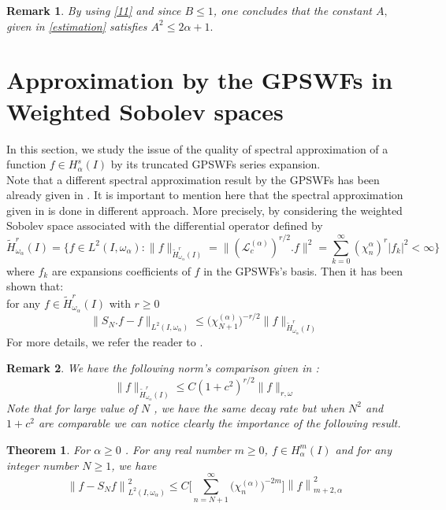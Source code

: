 \documentclass[]{article}
\newtheorem{theorem}{Theorem}
\newtheorem{remark}{Remark}
\newcounter{rea}
\newcommand{\norm}[1]{{\left\|{#1}\right\|}}
\begin{document}
\begin{remark} \label{rq}
By using \eqref{11} and since $B\leq1$, one concludes that the constant $A,$ given in \eqref{estimation} satisfies $A^2\leq 2\alpha+1.$
\end{remark}


\section{Approximation by the GPSWFs in Weighted Sobolev spaces}



In this section, we study the issue of the quality of spectral approximation of a function $f \in H^s_{\alpha}(I)$ by its truncated GPSWFs series expansion. \\
Note that a different spectral approximation result by the GPSWFs has been already given in \cite{Wang2}. It is important to mention here that the spectral approximation given in \cite{Wang2} is done in different approach. More precisely, by considering the weighted Sobolev space associated with the differential operator defined by
$$ \widetilde{H}^{r}_{\omega_{\alpha}}(I) = \{ f\in L^2(I,\omega_{\alpha}): \|f\|_{\widetilde{H}^{r}_{\omega_{\alpha}}(I)} = \|(\mathcal{L}^{(\alpha)}_c)^{r/2}.f\|^2 = \sum_{k=0}^{\infty}(\chi_n^{\alpha})^r |f_k|^2 <\infty \} $$
where $f_k$ are expansions coefficients of $f$ in the GPSWFs's basis. Then it has been shown that: \\
for any $f \in \widetilde{H}^{r}_{\omega_{\alpha}}(I) $ with $ r\geq 0 $
$$ \| S_{N}.f-f \|_{L^2(I,\omega_{\alpha})} \leq \Big( \chi^{(\alpha)}_{N+1} \Big)^{-r/2} \|f\|_{\widetilde{H}^{r}_{\omega_{\alpha}}(I)} $$
For more details, we refer the reader to \cite{Wang2}.\\
\begin{remark}
	We have the following norm's comparison given in \cite{Wang2} :
	$$ \|f\|_{\widetilde{H}^{r}_{\omega_{\alpha}}(I)} \leq
	C (1+c^2)^{r/2} \|f\|_{r,\omega} $$
	Note that for large value of $N$ , we have the same decay rate but when $N^2$ and $ 1+c^2$ are comparable we can notice clearly the importance of the following result.
	
\end{remark}
\begin{theorem}
	For $\alpha \geq 0 $ . For any real number $m \geq 0 $, $ f \in H^m_{\alpha} (I) $ and for any integer number $N \geq 1 $, we have
	\begin{equation} \label{approx1}
	\norm{f-S_Nf}^2_{L^2(I,\omega_\alpha)} \leq C \Bigg[ \sum_{n=N+1}^{\infty} \Big( \chi_{n}^{(\alpha)} \Big)^{-2m} \Bigg] \norm{f}_{m+2,\alpha}^2
	\end{equation}

\end{theorem}
\end{document}
